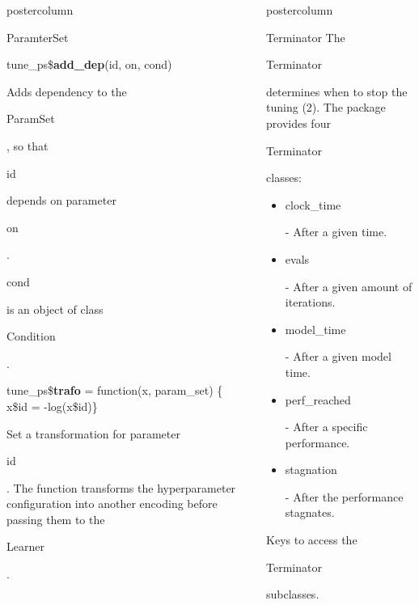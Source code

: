 \documentclass{beamer}
\newlength{\columnheight} %
\newcommand{\codeinline}[1]{\begin{codeboxinline}#1\end{codeboxinline}}
\begin{document}
\begin{frame}[fragile]{}
\begin{columns}
\begin{column}{.245\textwidth}
\begin{beamercolorbox}[center]{postercolumn}
\begin{minipage}{.98\textwidth}
{\begin{myblock}{ParamterSet}
							\\
							\begin{codebox}
								tune\_ps\$\textbf{add\_dep}(id, on, cond)
							\end{codebox}
							Adds dependency to the \codeinline{ParamSet}, so that \codeinline{id} depends on parameter \codeinline{on}.
							\codeinline{cond} is an object of class \codeinline{Condition}.
							\\
							\begin{codeboxmultiline}[width=26cm]
								tune\_ps\$\textbf{trafo} = function(x, param\_set) \{ \\
								\hspace*{1ex}x\$id = -log(x\$id)\}
							\end{codeboxmultiline}
							Set a transformation for parameter \codeinline{id}. 
							The function transforms the hyperparameter configuration into another encoding 
							before passing them to the \codeinline{Learner}.
						\end{myblock}
						\vfill}
				\end{minipage}
			\end{beamercolorbox}
		\end{column}
		\begin{column}{.245\textwidth}
			\begin{beamercolorbox}[center]{postercolumn}
				\begin{minipage}{.98\textwidth}
					\parbox[t][\columnheight]{\textwidth}{
						\begin{myblock}{Terminator}
							The \codeinline{Terminator} determines when to stop the tuning (2). The package provides four \codeinline{Terminator} classes:
							\\
							\begin{itemize}
								\item \codeinline{clock\_time} - After a given time.
								\item \codeinline{evals} - After a given amount of iterations.
								\item \codeinline{model\_time}  - After a given model time.
								\item \codeinline{perf\_reached} - After a specific performance.
								\item \codeinline{stagnation} - After the performance stagnates.
							\end{itemize}
							\vspace{0.5cm}
							Keys to access the \codeinline{Terminator} subclasses.
							\\

\end{myblock}}
\end{minipage}
\end{beamercolorbox}
\end{column}
\end{columns}
\end{frame}
\end{document}
